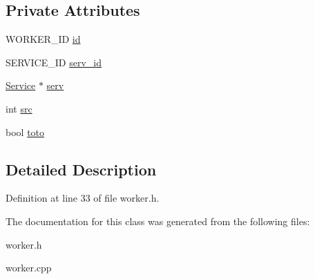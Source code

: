 \subsection*{Private Attributes}
\begin{CompactItemize}
\item 
\hypertarget{classWorker_b5ffcb995e12fa71b9551e91729d6972}{
WORKER\_\-ID \hyperlink{classWorker_b5ffcb995e12fa71b9551e91729d6972}{id}}
\label{classWorker_b5ffcb995e12fa71b9551e91729d6972}

\item 
\hypertarget{classWorker_d7dc76e301fd2bcf5d3a2088a59f1378}{
SERVICE\_\-ID \hyperlink{classWorker_d7dc76e301fd2bcf5d3a2088a59f1378}{serv\_\-id}}
\label{classWorker_d7dc76e301fd2bcf5d3a2088a59f1378}

\item 
\hypertarget{classWorker_454e1764ed165af733cc44a73e395692}{
\hyperlink{classService}{Service} $\ast$ \hyperlink{classWorker_454e1764ed165af733cc44a73e395692}{serv}}
\label{classWorker_454e1764ed165af733cc44a73e395692}

\item 
\hypertarget{classWorker_895c3ebc198018ea3391c09bc802d2f6}{
int \hyperlink{classWorker_895c3ebc198018ea3391c09bc802d2f6}{src}}
\label{classWorker_895c3ebc198018ea3391c09bc802d2f6}

\item 
\hypertarget{classWorker_7ba5a18b2918cf9e704536b763be37f7}{
bool \hyperlink{classWorker_7ba5a18b2918cf9e704536b763be37f7}{toto}}
\label{classWorker_7ba5a18b2918cf9e704536b763be37f7}

\end{CompactItemize}


\subsection{Detailed Description}




Definition at line 33 of file worker.h.

The documentation for this class was generated from the following files:\begin{CompactItemize}
\item 
worker.h\item 
worker.cpp\end{CompactItemize}
